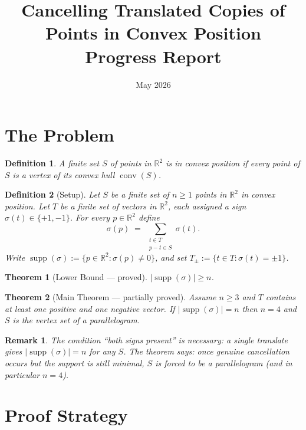 \documentclass[12pt,a4paper]{article}
\title{\textbf{Cancelling Translated Copies of Points in Convex Position}\\[6pt]
\large Progress Report}
\author{}
\date{May 2026}
\newtheorem{theorem}{Theorem}
\newtheorem{definition}{Definition}
\newtheorem{remark}{Remark}
\theoremstyle{definition}
\begin{document}
\maketitle
\tableofcontents
\newpage

\section{The Problem}

\begin{definition}
A finite set $S$ of points in $\mathbb{R}^2$ is in \emph{convex position} if every point of $S$
is a vertex of its convex hull $\operatorname{conv}(S)$.
\end{definition}

\begin{definition}[Setup]
Let $S$ be a finite set of $n \geq 1$ points in $\mathbb{R}^2$ in convex position.
Let $T$ be a finite set of vectors in $\mathbb{R}^2$, each assigned a sign $\sigma(t)\in\{+1,-1\}$.
For every $p\in\mathbb{R}^2$ define
\[
  \sigma(p) \;=\; \sum_{\substack{t\in T\\ p-t\in S}} \sigma(t).
\]
Write $\operatorname{supp}(\sigma):=\{p\in\mathbb{R}^2:\sigma(p)\neq 0\}$, and set
$T_\pm:=\{t\in T:\sigma(t)=\pm1\}$.
\end{definition}

\begin{theorem}[Lower Bound --- proved]
$|\operatorname{supp}(\sigma)|\ge n$.
\end{theorem}

\begin{theorem}[Main Theorem --- partially proved]\label{thm:main}
Assume $n\ge 3$ and $T$ contains at least one positive and one negative vector.
If $|\operatorname{supp}(\sigma)|=n$ then $n=4$ and $S$ is the vertex set of a parallelogram.
\end{theorem}

\begin{remark}
The condition ``both signs present'' is necessary: a single translate gives $|\operatorname{supp}(\sigma)|=n$
for any $S$.  The theorem says: once genuine cancellation occurs but the support is still minimal,
$S$ is forced to be a parallelogram (and in particular $n=4$).
\end{remark}

\section{Proof Strategy}
\end{document}

